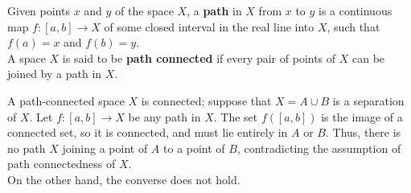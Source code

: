 \begin{definition}
Given points $x$ and $y$ of the space $X$, a \textbf{path} in $X$ from $x$ to $y$
is a continuous map $f\colon [a, b] \rightarrow X$ of some closed interval in the real line into $X$, such
that $f(a) = x$ and $f(b) = y$. \\

A space $X$ is said to be \textbf{path connected} if every pair of points of $X$ can be joined by a path in $X$.
\end{definition}

\begin{remark}
A path-connected space $X$ is connected; suppose that $X = A \cup B$ is a separation of $X$. Let $f\colon [a, b] \rightarrow X$ be any path in $X$. 
The set $f([a, b])$ is the image of a connected set, so it is connected, and must lie entirely in $A$ or $B$. Thus, there is no path $X$
joining a point of $A$ to a point of $B$, contradicting the assumption of path connectedness of $X$. \\

On the other hand, the converse does not hold.
\end{remark}
